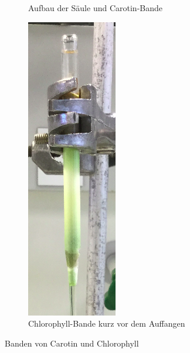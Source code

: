 \documentclass{article}
\begin{document}
\begin{figure}
\begin{subfigure}{.5\textwidth}
          \caption{Aufbau der Säule und Carotin-Bande}
          \label{fig:TrennungCarotin}
        \end{subfigure}%
        \begin{subfigure}{.5\textwidth}
          \centering
          \includegraphics[width=.4\linewidth]{Graphiken/Versuchsanordnungen/TrennungChlorophyll.png}
          \caption{Chlorophyll-Bande kurz vor dem Auffangen}
          \label{fig:TrennungChlorophyll}
        \end{subfigure}
        \caption[Banden von Carotin und Chlorophyll, Quelle, Autor]{Banden von Carotin und Chlorophyll}
        \label{fig:TrennungSpinat}
      \end{figure}
      
  \pagebreak
  
  \listofreactions
  \printbibliography[title=Literaturverzeichnis]
  \listoffigures
  \listoftables
  
\end{document}
